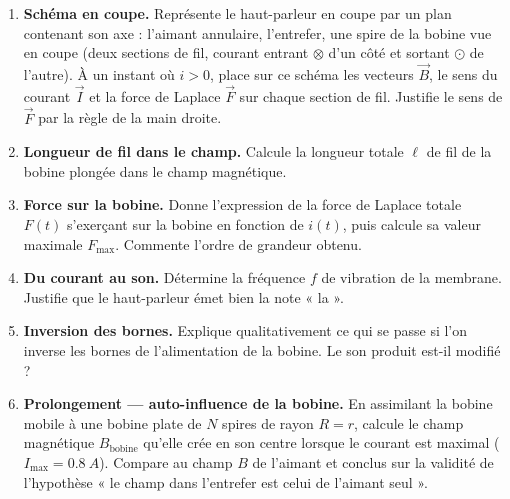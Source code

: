 \documentclass[11pt]{article}
\newcounter{popsec}
\newcounter{popsub}
\newcommand{\courssub}[1]{%
  \stepcounter{popsub}%
  \par\vspace{9pt}\noindent{\popxbold\fontsize{11.5}{13}\selectfont\color{popink}{\color{poporange}\thepopsec.\thepopsub}\hspace{6pt}#1}\par\nopagebreak\vspace{4pt}
}
\begin{document}
\begin{enumerate}
\item \textbf{Schéma en coupe.} Représente le haut-parleur en coupe par un plan contenant son axe : l'aimant annulaire, l'entrefer, une spire de la bobine vue en coupe (deux sections de fil, courant entrant $\otimes$ d'un côté et sortant $\odot$ de l'autre). À un instant où $i > 0$, place sur ce schéma les vecteurs $\vec{B}$, le sens du courant $\vec{I}$ et la force de Laplace $\vec{F}$ sur chaque section de fil. Justifie le sens de $\vec{F}$ par la règle de la main droite.
\item \textbf{Longueur de fil dans le champ.} Calcule la longueur totale $\ell$ de fil de la bobine plongée dans le champ magnétique.
\item \textbf{Force sur la bobine.} Donne l'expression de la force de Laplace totale $F(t)$ s'exerçant sur la bobine en fonction de $i(t)$, puis calcule sa valeur maximale $F_{\max}$. Commente l'ordre de grandeur obtenu.
\item \textbf{Du courant au son.} Détermine la fréquence $f$ de vibration de la membrane. Justifie que le haut-parleur émet bien la note « la ».
\item \textbf{Inversion des bornes.} Explique qualitativement ce qui se passe si l'on inverse les bornes de l'alimentation de la bobine. Le son produit est-il modifié ?
\item \textbf{Prolongement — auto-influence de la bobine.} En assimilant la bobine mobile à une bobine plate de $N$ spires de rayon $R = r$, calcule le champ magnétique $B_{\text{bobine}}$ qu'elle crée en son centre lorsque le courant est maximal ($I_{\max} = \SI{0,8}{A}$). Compare au champ $B$ de l'aimant et conclus sur la validité de l'hypothèse « le champ dans l'entrefer est celui de l'aimant seul ».
\end{enumerate}

\courssub{Ressources à mobiliser}
\end{document}
